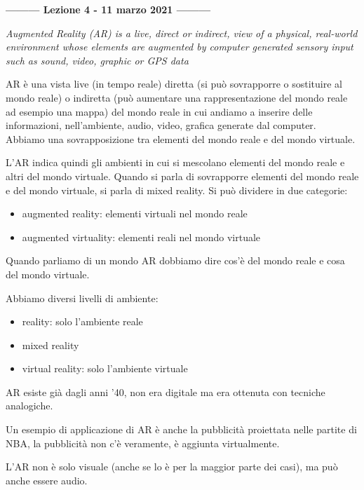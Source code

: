 \begin{center}
    \textbf{--------- Lezione 4 - 11 marzo 2021 ---------}
\end{center}
\begin{center}
    \textit{Augmented Reality (AR) is a live, direct or indirect, view of a physical, real-world environment whose elements are augmented by computer generated sensory input such as sound, video, graphic or GPS data}
\end{center}

AR è una vista live (in tempo reale) diretta (si può sovrapporre o sostituire al mondo reale) o indiretta (può aumentare una rappresentazione del mondo reale ad esempio una mappa) del mondo reale in cui andiamo a inserire delle informazioni, nell'ambiente, audio, video, grafica generate dal computer. 
\\ Abbiamo una sovrapposizione tra elementi del mondo reale e del mondo virtuale. 

L'AR indica quindi gli ambienti in cui si mescolano elementi del mondo reale e altri del mondo virtuale.
Quando si parla di sovrapporre elementi del mondo reale e del mondo virtuale, si parla di mixed reality. 
Si può dividere in due categorie:
\begin{itemize}
    \item augmented reality: elementi virtuali nel mondo reale
    \item augmented virtuality: elementi reali nel mondo virtuale
\end{itemize} 

Quando parliamo di un mondo AR dobbiamo dire cos'è del mondo reale e cosa del mondo virtuale.

Abbiamo diversi livelli di ambiente:
\begin{itemize}
    \item reality: solo l'ambiente reale
    \item mixed reality
    \item virtual reality: solo l'ambiente virtuale
\end{itemize}

AR esiste già dagli anni '40, non era digitale ma era ottenuta con tecniche analogiche.

Un esempio di applicazione di AR è anche la pubblicità proiettata nelle partite di NBA, la pubblicità non c'è veramente, è aggiunta virtualmente. 

L'AR non è solo visuale (anche se lo è per la maggior parte dei casi), ma può anche essere audio. 

